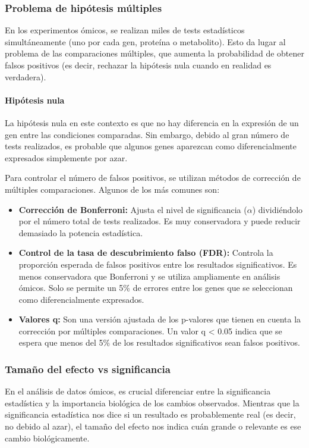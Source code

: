 \subsubsection{Problema de hipótesis múltiples}
En los experimentos ómicos, se realizan miles de tests estadísticos simultáneamente (uno por cada gen, proteína o metabolito). Esto da lugar al problema de las comparaciones múltiples, que aumenta la probabilidad de obtener falsos positivos (es decir, rechazar la hipótesis nula cuando en realidad es verdadera).

\paragraph{Hipótesis nula} La hipótesis nula en este contexto es que no hay diferencia en la expresión de un gen entre las condiciones comparadas. Sin embargo, debido al gran número de tests realizados, es probable que algunos genes aparezcan como diferencialmente expresados simplemente por azar.

Para controlar el número de falsos positivos, se utilizan métodos de corrección de múltiples comparaciones. Algunos de los más comunes son: 
\begin{itemize}
\item \textbf{Corrección de Bonferroni:} Ajusta el nivel de significancia ($\alpha$) dividiéndolo por el número total de tests realizados. Es muy conservadora y puede reducir demasiado la potencia estadística.
\item \textbf{Control de la tasa de descubrimiento falso (FDR):} Controla la proporción esperada de falsos positivos entre los resultados significativos. Es menos conservadora que Bonferroni y se utiliza ampliamente en análisis ómicos. Solo se permite un 5\% de errores entre los genes que se seleccionan como diferencialmente expresados.
\item \textbf{Valores q:} Son una versión ajustada de los p-valores que tienen en cuenta la corrección por múltiples comparaciones. Un valor q < 0.05 indica que se espera que menos del 5\% de los resultados significativos sean falsos positivos.
\end{itemize}

\subsubsection{Tamaño del efecto vs significancia}
En el análisis de datos ómicos, es crucial diferenciar entre la significancia estadística y la importancia biológica de los cambios observados. Mientras que la significancia estadística nos dice si un resultado es probablemente real (es decir, no debido al azar), el tamaño del efecto nos indica cuán grande o relevante es ese cambio biológicamente.

